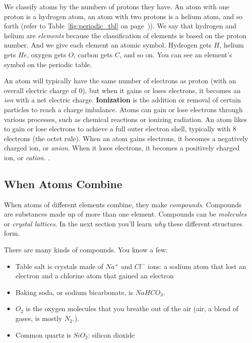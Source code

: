 We classify atoms by the numbers of protons they have. An atom with one proton
is a hydrogen atom, an atom with two protons is a helium atom, and so forth
(refer to Table~\ref{fig:periodic_tbl} on page~\pageref{fig:periodic_tbl})). We say that hydrogen and helium are \textit{
elements} because the classification of elements is based on the proton number.
And we give each element an atomic symbol. Hydrogen gets $H$, helium gets $He$,
oxygen gets $O$, carbon gets $C$, and so on. You can see an element's 
symbol on the periodic table. 

An atom will typically have the same number of electrons as proton (with an overall electric charge of $0$), but when it gains or loses electrons, it becomes an \textit{ion} with a net electric charge. \textbf{Ionization} is the addition or removal of certain particles to reach a charge imbalance. Atoms can gain or lose electrons through various processes, such as chemical reactions or ionizing radiation. An atom likes to gain or lose electrons to achieve a full outer electron shell, typically with 8 electrons (the octet rule). When an atom gains electrons, it becomes a negatively charged ion, or \textit{anion}. When it loses electrons, it becomes a positively charged ion, 
or \textit{cation}. . 

\subsection{When Atoms Combine}
When atoms of different elements combine, they make \textit{compounds}. Compounds
are substances made up of more than one element. Compounds can be 
\textit{molecules} or \textit{crystal lattices}. In the next section you'll learn
\textit{why} these different structures form. 

There are many kinds of compounds. You know a few:
\begin{itemize}
\item Table salt is crystals made of $Na^{+}$ and $Cl^{-}$ ions: a sodium atom 
that lost an electron and a chlorine atom that gained an electron
\item Baking soda, or sodium bicarbonate, is $NaHCO_3$.
\item $O_2$ is the oxygen molecules that you breathe out of the air (air, a
blend of gases, is mostly $N_2$.).
\item Common quartz is $SiO_2$: silicon dioxide
\end{itemize}

